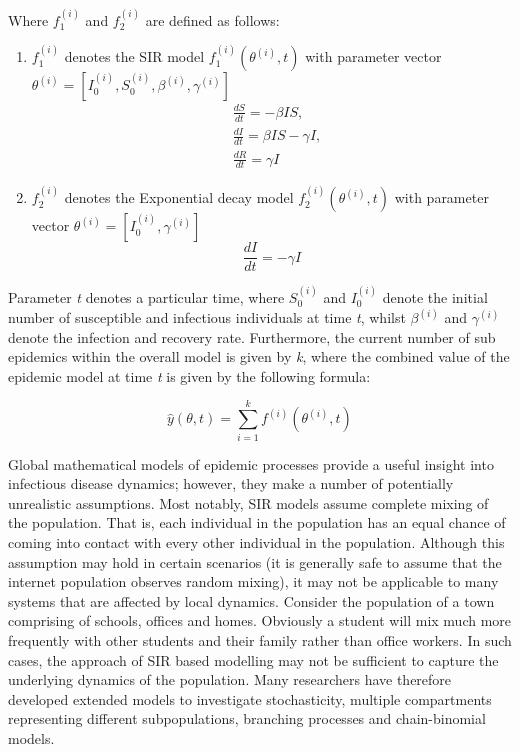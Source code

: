 \begin{framed}
Where $f_1^{(i)}$ and $f_2^{(i)}$ are defined as follows:
\begin{enumerate}[label=\Alph{*}.]
	\item $f_1^{(i)}$ denotes the SIR model $f_1^{(i)}(\theta^{(i)}, t)$ with parameter vector $\theta^{(i)} = [I_0^{(i)}, S_0^{(i)}, \beta^{(i)}, \gamma^{(i)}]$
\begin{equation*}
	\begin{split}
	&\frac{dS}{dt} = -\beta IS, \\
	&\frac{dI}{dt} = \beta IS - \gamma I, \\
	&\frac{dR}{dt} = \gamma I
	\end{split}
\end{equation*}
	\item $f_2^{(i)}$ denotes the Exponential decay model $f_2^{(i)}(\theta^{(i)}, t)$ with parameter vector $\theta^{(i)} = [I_0^{(i)}, \gamma^{(i)}]$
\begin{equation*}
	\frac{dI}{dt} = - \gamma I
\end{equation*}
\end{enumerate}
	
Parameter \emph{t} denotes a particular time, where $S_0^{(i)}$ and
$I_0^{(i)}$ denote the initial number of susceptible and infectious
individuals at time \emph{t}, whilst $\beta^{(i)}$ and
$\gamma^{(i)}$denote the infection and recovery rate. Furthermore, the
current number of sub epidemics within the overall model is given by
\emph{k}, where the combined value of the epidemic model at time
\emph{t} is given by the following formula:

\begin{equation*}
	\hat{y}(\theta ,t) = \sum\limits_{i=1}^k f^{(i)}(\theta^{(i)} ,t)
\end{equation*}
\end{framed}

Global mathematical models of epidemic processes provide a useful
insight into infectious disease dynamics; however, they make a number
of potentially unrealistic assumptions. Most notably, SIR models
assume complete mixing of the population. That is, each individual in
the population has an equal chance of coming into contact with every
other individual in the population. Although this assumption may hold
in certain scenarios (it is generally safe to assume that the internet
population observes random mixing), it may not be applicable to many
systems that are affected by local dynamics. Consider the population
of a town comprising of schools, offices and homes. Obviously a
student will mix much more frequently with other students and their
family rather than office workers. In such cases, the approach of SIR
based modelling may not be sufficient to capture the underlying
dynamics of the population. Many researchers have therefore developed
extended models to investigate stochasticity, multiple compartments
representing different subpopulations, branching processes and
chain-binomial models.\cite{computational}

